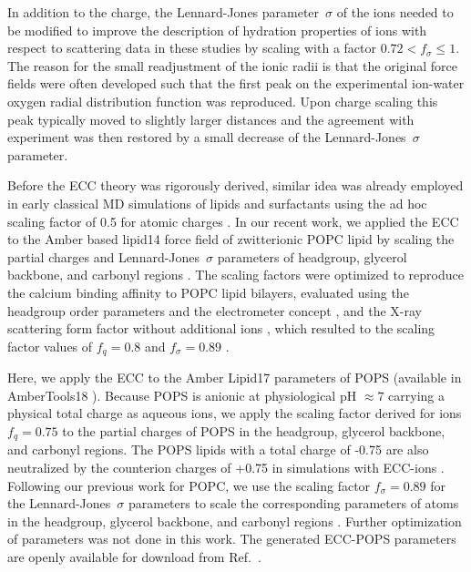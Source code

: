 \documentclass[journal=jctcce,manuscript=article]{achemso}
\begin{document}
In addition to the charge, the Lennard-Jones parameter~$\sigma$ of the ions needed to be modified 
to improve the description of hydration properties of ions with respect to scattering data in these studies 
by scaling with a factor $ 0.72 < f_\sigma \leq 1$.
The reason for the small readjustment of the ionic radii is that the original force fields were often developed such that the first peak on the experimental ion-water oxygen radial distribution function was reproduced. 
Upon charge scaling this peak typically moved to slightly larger distances and the agreement with experiment was then restored by a small decrease of the Lennard-Jones~$\sigma$ parameter.

Before the ECC theory was rigorously derived, similar idea was already employed in early classical 
MD simulations of lipids and surfactants using the ad hoc scaling factor of 0.5 for atomic charges  \cite{jonsson86,egberts94, berendsen1996}. 
In our recent work, we applied the ECC to the Amber based lipid14 force field of zwitterionic POPC lipid \cite{dickson14}
by scaling the partial charges and Lennard-Jones~$\sigma$ parameters of headgroup, glycerol backbone,
and carbonyl regions \cite{melcr18}. The scaling factors were optimized to reproduce 
the calcium binding affinity to POPC lipid bilayers, evaluated using the headgroup order parameters
and the electrometer concept \cite{akutsu81,altenbach84,seelig87,catte16}, and the X-ray scattering form factor
without additional ions \cite{kucerka11}, which resulted to the scaling factor values of $f_q = 0.8$ and $f_\sigma = 0.89$  \cite{melcr18}.

Here, we apply the ECC to the Amber Lipid17 parameters of POPS \cite{lipid17-future} (available in AmberTools18 \cite{amber18}). 
Because POPS is anionic at physiological pH $\approx 7$ carrying a physical total charge as aqueous ions, 
we apply the scaling factor derived for
ions\cite{leontyev09} $f_q = 0.75$ to the partial charges of POPS 
in the headgroup, glycerol backbone, and carbonyl regions. The POPS lipids with a total charge of -0.75 are also neutralized
by the counterion charges of +0.75 in simulations with ECC-ions \cite{Pluharova2014, kohagen16, martinek17}.
Following our previous work for POPC, we use the scaling factor $f_\sigma = 0.89$ for the Lennard-Jones~$\sigma$ parameters 
to scale the corresponding parameters of atoms 
in the headgroup, glycerol backbone, and carbonyl regions \cite{melcr18}. 
Further optimization of parameters was not done in this work. 
The generated ECC-POPS parameters are openly available for download from Ref.~. 
\end{document}
